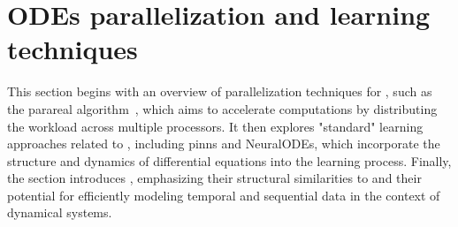     
    
    
    
    

\section{ODEs parallelization and learning techniques}\label{sec:learning_overview}

This section begins with an overview of parallelization techniques for , such as the parareal algorithm~\cite{cParareal}, which aims to accelerate computations by distributing the workload across multiple processors. 
It then explores "standard" learning approaches related to , including \gls{pinns} and NeuralODEs, which incorporate the structure and dynamics of differential equations into the learning process. 
Finally, the section introduces , emphasizing their structural similarities to  and their potential for efficiently modeling temporal and sequential data in the context of dynamical systems.

